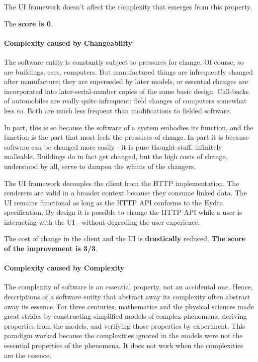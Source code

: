 The UI framework doesn't affect the complexity that emerges from this property.

The \textbf{score is 0}.

\paragraph{Complexity caused by Changeability}
The software entity is constantly subject to pressures for change. Of course, so are buildings, cars, computers. But manufactured things are infrequently changed after manufacture; they are superseded by later models, or essential changes are incorporated into later-serial-number copies of the same basic design. Call-backs of automobiles are really quite infrequent; field changes of computers somewhat less so. Both are much less frequent than modifications to fielded software.

In part, this is so because the software of a system embodies its function, and the function is the part that most feels the pressures of change. In part it is because software can be changed more easily - it is pure thought-stuff, infinitely malleable. Buildings do in fact get changed, but the high costs of change, understood by all, serve to dampen the whims of the changers. \citep{nosilverbullet}

The UI framework decouples the client from the HTTP implementation. The renderers are valid in a broader context because they consume linked data. The UI remains functional as long as the HTTP API conforms to the Hydra specification. By design it is possible to change the HTTP API while a user is interacting with the UI - without degrading the user experience.

The cost of change in the client and the UI is \textbf{drastically} reduced. \textbf{The score of the improvement is 3/3}.

\paragraph{Complexity caused by Complexity}
The complexity of software is an essential property, not an accidental one. Hence, descriptions of a software entity that abstract away its complexity often abstract away its essence. For three centuries, mathematics and the physical sciences made great strides by constructing simplified models of complex phenomena, deriving properties from the models, and verifying those properties by experiment. This paradigm worked because the complexities ignored in the models were not the essential properties of the phenomena. It does not work when the complexities are the essence. \citep{nosilverbullet}

